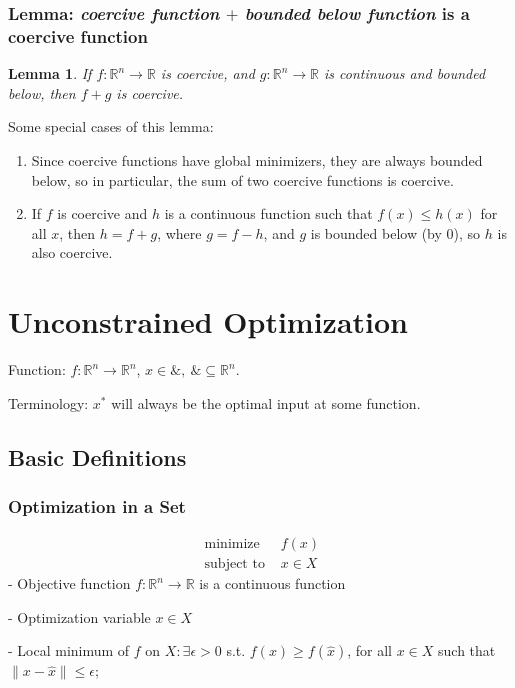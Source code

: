 \documentclass[11pt,a4paper]{article}
\newtheorem{lemma}{Lemma}
\begin{document}
\subsubsection{Lemma: \textit{coercive function} $+$ \textit{bounded below function} is a coercive function}
\begin{lemma}
    If $f: \mathbb{R}^n \rightarrow \mathbb{R}$ is coercive, and $g: \mathbb{R}^n \rightarrow \mathbb{R}$ is continuous and bounded below, then $f+g$ is coercive.
\end{lemma}
Some special cases of this lemma:
\begin{enumerate}[$\bullet$]
    \item Since coercive functions have global minimizers, they are always bounded below, so in particular, the sum of two coercive functions is coercive.
    \item If $f$ is coercive and $h$ is a continuous function such that $f(x) \leq h(x)$ for all $x$, then $h = f + g$, where $g = f - h$, and $g$ is bounded below (by $0$), so $h$ is also coercive.
\end{enumerate}




\section{Unconstrained Optimization}
Function: $f:\mathbb{R}^n \rightarrow	\mathbb{R}^n$, $x\in \&,\ \&\subseteq \mathbb{R}^n$.

Terminology: $x^*$ will always be the optimal input at some function.

\subsection{Basic Definitions}
\subsubsection{Optimization in a Set}
$$\begin{array}{ll}\text { minimize } & f(x) \\ \text { subject to } & x \in X\end{array}$$
- Objective function $f: \mathbb{R}^{n} \rightarrow \mathbb{R}$ is a continuous function

- Optimization variable $x \in X$

- Local minimum of $f$ on $X: \exists \epsilon>0$ s.t. $f(x) \geq f(\hat{x})$, for all $x \in X$ such that $\|x-\hat{x}\| \leq \epsilon$;
\end{document}
